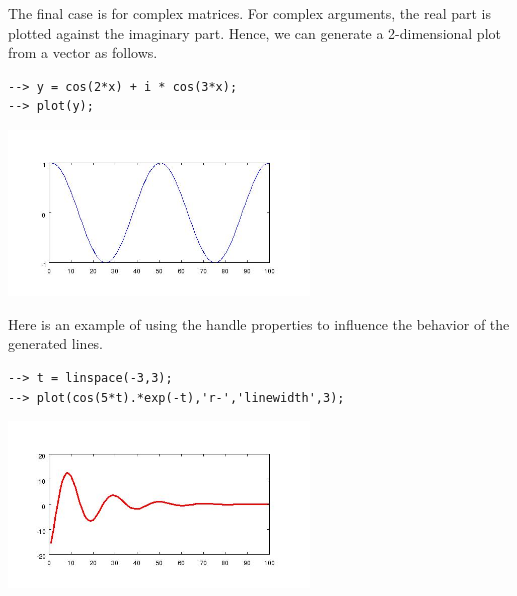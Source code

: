 The final case is for complex matrices.  For complex arguments, the real part is
plotted against the imaginary part.  Hence, we can generate a 2-dimensional plot
from a vector as follows.
\begin{verbatim}
--> y = cos(2*x) + i * cos(3*x);
--> plot(y);
\end{verbatim}


\centerline{\includegraphics[width=8cm]{plot5}}


Here is an example of using the handle properties to influence the behavior
of the generated lines.
\begin{verbatim}
--> t = linspace(-3,3);
--> plot(cos(5*t).*exp(-t),'r-','linewidth',3);
\end{verbatim}


\centerline{\includegraphics[width=8cm]{plot6}}

